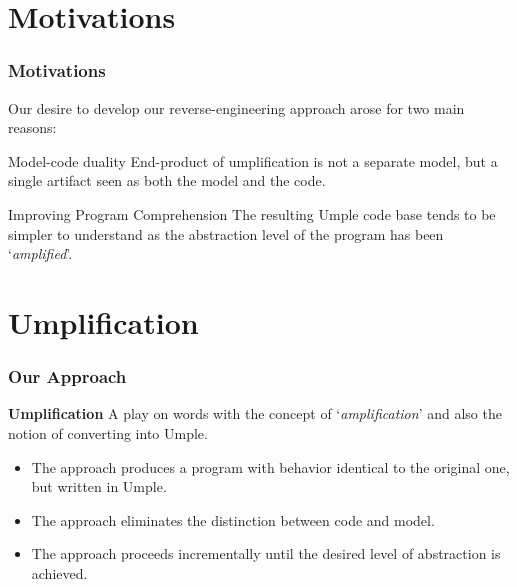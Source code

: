 \documentclass[xcolor=table]{beamer}
\begin{document}
\section{Motivations} 
\begin{frame}
\frametitle{Motivations}
Our desire to develop our reverse-engineering approach arose for two main reasons:

\begin{block}{Model-code duality}
End-product of umplification is not a separate model, but a single artifact seen as both the model and the code. 
\end{block}

\begin{block}{Improving Program Comprehension}
The resulting Umple code base tends to be simpler to understand as the abstraction level of the program has been `\textit{amplified}'.
\end{block}
\end{frame}

\section{Umplification}

\begin{frame}
\frametitle{Our Approach}
\centering
\textcolor{important}{\textbf{\large Umplification}}
\centering
A play on words with the concept of ‘\textit{amplification}’ and also the notion of converting into Umple. 
\newline
\begin{itemize}
	\item The approach produces a program with behavior identical to the original one, but written in Umple.
	\item The approach eliminates the distinction between code and model.
	\item The approach proceeds incrementally until the desired level of abstraction is achieved.
\end{itemize}
\end{frame}
\end{document}
